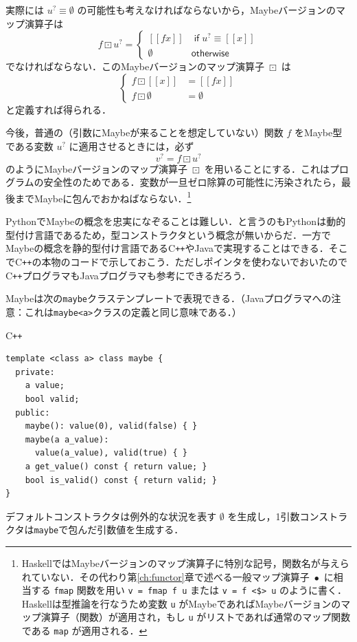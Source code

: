 \documentclass[a4paper,twocolumn]{jsbook}
\def\[{\left[\!\left[}
\def\]{\right]\!\right]}
\newcommand{\programminglanguage}[1]{\textsf{#1}}
\newcommand{\cxx}{\programminglanguage{C}\texttt{++}}
\newcommand{\haskell}{\programminglanguage{Haskell}}
\newcommand{\java}{\programminglanguage{Java}}
\newcommand{\python}{\programminglanguage{Python}}
\newcommand{\code}[1]{\texttt{#1}}
\newenvironment{cxxcode}{\begin{itembox}[r]{\cxx}}{\end{itembox}}
\newcommand{\mKeyword}[1]{\mathsf{#1}} %
\newcommand{\mIfKeyword}{\mKeyword{if}}
\newcommand{\mOtherwiseKeyword}{\mKeyword{otherwise}}
\DeclareMathOperator{\mIf}{\mIfKeyword}
\DeclareMathOperator{\mOtherwise}{\mOtherwiseKeyword}
\newcommand{\mNothing}{\emptyset}
\DeclareMathOperator{\mMap}{\bullet}
\DeclareMathOperator{\mMapMaybe}{\boxdot}
\newcommand{\mMaybeWith}[1]{\[#1\]}
\newcommand{\mMaybe}[1]{{#1}^\text{?}}
\begin{document}
実際には $\mMaybe{u}\equiv\mNothing$ の可能性も考えなければならないから，Maybeバージョンのマップ演算子は
\begin{equation}
f\mMapMaybe\mMaybe{u}=\begin{cases}
\mMaybeWith{fx}&\mIf\mMaybe{u}\equiv\mMaybeWith{x}\\
\mNothing&\mOtherwise
\end{cases}
\end{equation}
でなければならない．このMaybeバージョンのマップ演算子 $\mMapMaybe$ は
\begin{equation}
\left\{
\begin{split}
f\mMapMaybe\mMaybeWith{x}&=\mMaybeWith{fx}\\
f\mMapMaybe\mNothing&=\mNothing
\end{split}
\right.
\end{equation}
と定義すれば得られる．

今後，普通の（引数にMaybeが来ることを想定していない）関数 $f$ をMaybe型である変数 $\mMaybe{u}$ に適用させるときには，必ず
\begin{equation}
\mMaybe{v}=f\mMapMaybe\mMaybe{u}
\end{equation}
のようにMaybeバージョンのマップ演算子 $\mMapMaybe$ を用いることにする．これはプログラムの安全性のためである．変数が一旦ゼロ除算の可能性に汚染されたら，最後までMaybeに包んでおかねばならない．\footnote{\haskell ではMaybeバージョンのマップ演算子に特別な記号，関数名が与えられていない．その代わり第\ref{ch:functor}章で述べる一般マップ演算子 $\mMap$ に相当する \code{fmap} 関数を用い \code{v = fmap f u} または \code{v = f <\$> u} のように書く．\haskell は型推論を行なうため変数 \code{u} がMaybeであればMaybeバージョンのマップ演算子（関数）が適用され，もし \code{u} がリストであれば通常のマップ関数である \code{map} が適用される．}

\python でMaybeの概念を忠実になぞることは難しい．と言うのも\python は動的型付け言語であるため，型コンストラクタという概念が無いからだ．一方でMaybeの概念を静的型付け言語である\cxx や\java で実現することはできる．そこで\cxx の本物のコードで示しておこう．ただしポインタを使わないでおいたので\cxx プログラマも\java プログラマも参考にできるだろう．

Maybeは次の\code{maybe}クラステンプレートで表現できる．（\java プログラマへの注意：これは\code{maybe<a>}クラスの定義と同じ意味である．）
\begin{cxxcode}
\begin{verbatim}
template <class a> class maybe {
  private:
    a value;
    bool valid;
  public:
    maybe(): value(0), valid(false) { }
    maybe(a a_value):
      value(a_value), valid(true) { }
    a get_value() const { return value; }
    bool is_valid() const { return valid; }
}
\end{verbatim}
\end{cxxcode}
デフォルトコンストラクタは例外的な状況を表す $\mNothing$ を生成し，1引数コンストラクタは\code{maybe}で包んだ引数値を生成する．
\end{document}
